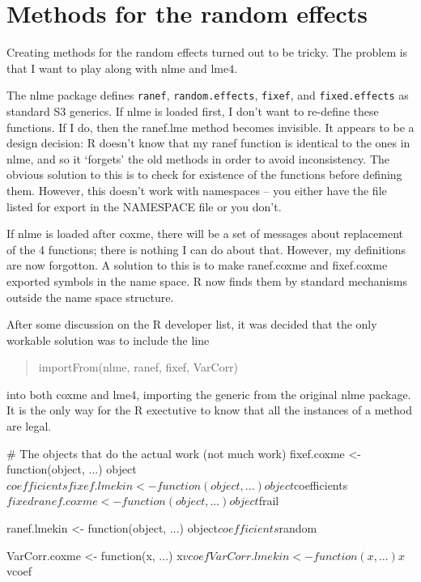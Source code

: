 \documentclass{article}
\begin{document}
\section{Methods for the random effects}
Creating methods for the random effects turned out to be tricky.
The problem is that I want to play along with nlme and lme4.

The nlme package defines {\tt{}ranef}, {\tt{}random.effects}, {\tt{}fixef}, and
{\tt{}fixed.effects} as standard S3 generics. 
If nlme is loaded first, I don't want to re-define these functions.
If I do, then the ranef.lme method becomes invisible.  
It appears to be a design decision: R doesn't know
that my ranef function is identical to the ones in nlme, and
so it `forgets' the old methods in order to avoid inconsistency.
The obvious solution to this is to check for existence of the functions
before defining them.
However, this doesn't work with namespaces -- you either have the file
listed for export in the NAMESPACE file or you don't.

If nlme is loaded after coxme, there will be a set of messages about
replacement of the 4 functions; there is nothing I can do about
that.  
However, my definitions are now forgotton.  A solution to this is to
make ranef.coxme and fixef.coxme exported symbols in the name space.
R now finds them by standard mechanisms outside the name space structure.

After some discussion on the R developer list, it was decided that the
only workable solution was to include the line
\begin{quote}
   importFrom(nlme, ranef, fixef, VarCorr)
\end{quote}
into both coxme and lme4, importing the generic from the original nlme
package.  It is the only way for the R exectutive to know that all the
instances of a method are legal.

\nwenddocs{}\endmoddef
# The objects that do the actual work (not much work)
fixef.coxme <- function(object, ...)
    object$coefficients

fixef.lmekin <- function(object, ...)
    object$coefficients$fixed

ranef.coxme <- function(object, ...)
    object$frail

ranef.lmekin <- function(object, ...)
    object$coefficients$random

VarCorr.coxme <- function(x, ...) 
    x$vcoef
    
VarCorr.lmekin <- function(x, ...) 
    x$vcoef
\end{document}
